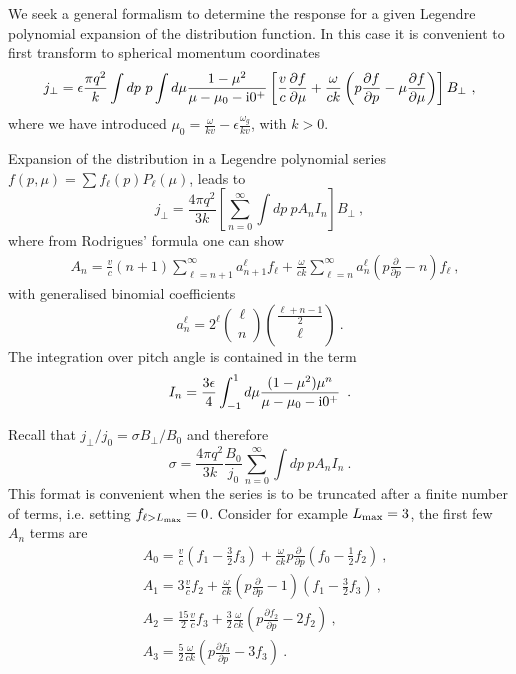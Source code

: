 \documentclass[a4paper,fleqn,usenatbib]{mnras}
\newcommand{\eqnb}{\begin{equation*}}
\newcommand{\eqne}{\end{equation*}}
\begin{document}
We seek a general formalism to determine the response for a given Legendre polynomial expansion of the distribution function. In this case it is convenient to first transform to spherical momentum coordinates 
\begin{equation}
\label{jperp}
j_\bot = \epsilon \frac{\pi q^2}{k}\int dp~ p \int d\mu  \frac{1-\mu^2}{\mu - \mu_0 -  {\rm i}0^+}
\left[ \frac{v}{c}\frac{\partial f}{\partial \mu}
+\frac{\omega}{ck} \left( p \frac{\partial f}{\partial p}- \mu\frac{\partial f}{\partial \mu} \right) \right] B_\bot~,
\end{equation}
where we have introduced $\mu_0 = \frac{\omega}{kv}-\epsilon\frac{\omega_g}{kv}$, with $k>0$.

Expansion of the distribution in a Legendre polynomial series $f(p,\mu) = \sum f_\ell(p) P_\ell(\mu)$, leads to
\eqnb
j_\bot =\frac{  4 \pi q^2}{3k}  \left[ \sum_{n=0}^\infty \int dp~ p  A_n I_n \right] B_\bot~,
\eqne
where from Rodrigues' formula one can show
\begin{align*}
&A_n =  \frac{v}{c} (n+1) \sum_{\ell=n+1}^{\infty}  a^\ell_{n+1} {f_\ell}+
\frac{\omega}{ck}\sum_{\ell=n}^{\infty}  a^\ell_{n}\left(
 p\frac{\partial}{\partial p} - n \right)f_\ell~,
\end{align*}
with generalised binomial coefficients 
\eqnb
 a^\ell_{n} = 2^\ell \binom{\ell}{n} \binom{\frac{\ell +n-1}{2}}{\ell} ~.
\eqne 
The integration over pitch angle is contained in the term
\eqnb
 I_n =\frac{3 \epsilon}{4} \int_{-1}^1 d\mu \frac{(1-\mu^2)\mu^n} {\mu-\mu_0 -  {\rm i}0^+}\enspace.
 \eqne 
 
\noindent
Recall that $j_\bot/j_{0} = \sigma B_\bot/B_0$ and therefore
\eqnb
\sigma =\frac{  4 \pi q^2}{3k}  \frac{B_0}{j_0} \sum_{n=0}^\infty \int dp~ p  A_n I_n  ~.
\eqne
This format is convenient when the series is to be truncated after a finite number of terms, i.e. setting $f_{\ell > L_{\rm max}}=0$.
Consider for example $L_{\rm max}=3$, the first few $A_n$ terms are
\begin{align*}
&A_0 = \frac{v}{c} \left(f_1-\frac{3}{2}f_3\right) +\frac{\omega}{ck}p\frac{\partial ~}{\partial p}\left(f_0 - \frac{1}{2} f_2\right)~,\nonumber\\
&A_1 =3 \frac{v}{c} f_2 +\frac{\omega}{ck}\left(p\frac{\partial}{\partial p}- 1\right)
\left(f_1-\frac{3}{2} f_3\right) ~, \\
&A_2 = \frac{15}{2} \frac{v}{c} f_3 +\frac{3}{2}\frac{\omega}{ck}\left(p\frac{\partial f_2}{\partial p}- 2 f_2\right)~,\nonumber \\
&A_3 = \frac{5}{2}\frac{\omega}{ck}\left(p\frac{\partial f_3}{\partial p}- 3 f_3\right)~.
\end{align*}
\end{document}
